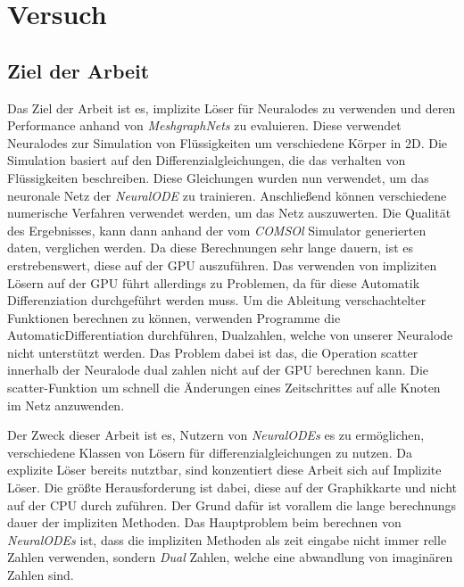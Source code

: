 



\chapter{Versuch} \label{ch:versuch}

\section{Ziel der Arbeit} \label{sec:goal}


Das Ziel der Arbeit ist es, implizite Löser für Neuralodes zu verwenden 
und deren Performance anhand von \textit{MeshgraphNets} zu evaluieren. 
Diese verwendet Neuralodes zur Simulation von Flüssigkeiten um verschiedene Körper in 2D.
Die Simulation basiert auf den Differenzialgleichungen, die das verhalten von Flüssigkeiten beschreiben.
Diese Gleichungen wurden nun verwendet, um das neuronale Netz der \textit{NeuralODE} zu trainieren.
Anschließend können verschiedene numerische Verfahren verwendet werden, um das Netz auszuwerten.
Die Qualität des Ergebnisses, kann dann anhand der vom \textit{COMSOl} \cite{} Simulator generierten daten,
verglichen werden.
Da diese Berechnungen sehr lange dauern, ist es erstrebenswert, diese auf der GPU auszuführen.
Das verwenden von impliziten Lösern auf der GPU führt allerdings zu Problemen, da für diese Automatik Differenziation durchgeführt werden muss.
Um die Ableitung verschachtelter Funktionen berechnen zu können, verwenden
Programme die AutomaticDifferentiation durchführen, Dualzahlen, welche von unserer Neuralode nicht unterstützt werden.
Das Problem dabei ist das, die Operation scatter innerhalb der Neuralode dual zahlen nicht auf der GPU 
berechnen kann.
Die scatter-Funktion um schnell die Änderungen eines Zeitschrittes auf alle Knoten im Netz anzuwenden. %


Der Zweck dieser Arbeit ist es, Nutzern von \textit{NeuralODEs} es zu ermöglichen, verschiedene Klassen von Lösern für differenzialgleichungen zu nutzen.
Da explizite Löser bereits nutztbar, sind konzentiert diese Arbeit sich auf Implizite Löser. 
Die größte Herausforderung ist dabei, diese auf der Graphikkarte und nicht auf der CPU durch zuführen.
Der Grund dafür ist vorallem die lange berechnungs dauer der impliziten Methoden.
Das Hauptproblem beim berechnen von \textit{NeuralODEs} ist, dass die impliziten Methoden als zeit eingabe nicht immer relle Zahlen verwenden,
sondern \textit{Dual} Zahlen, welche eine abwandlung von imaginären Zahlen sind.

